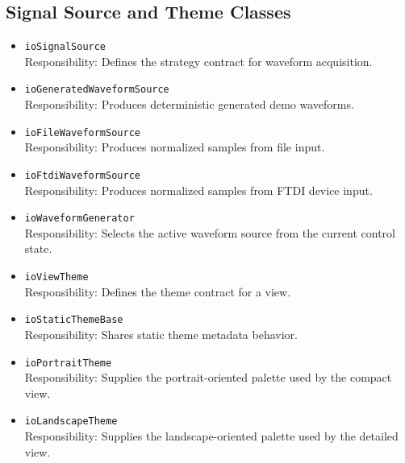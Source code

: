 \subsection{Signal Source and Theme Classes}
\begin{itemize}
    \item \texttt{ioSignalSource} \\
    Responsibility: Defines the strategy contract for waveform acquisition.

    \item \texttt{ioGeneratedWaveformSource} \\
    Responsibility: Produces deterministic generated demo waveforms.

    \item \texttt{ioFileWaveformSource} \\
    Responsibility: Produces normalized samples from file input.

    \item \texttt{ioFtdiWaveformSource} \\
    Responsibility: Produces normalized samples from FTDI device input.

    \item \texttt{ioWaveformGenerator} \\
    Responsibility: Selects the active waveform source from the current control state.

    \item \texttt{ioViewTheme} \\
    Responsibility: Defines the theme contract for a view.

    \item \texttt{ioStaticThemeBase} \\
    Responsibility: Shares static theme metadata behavior.

    \item \texttt{ioPortraitTheme} \\
    Responsibility: Supplies the portrait-oriented palette used by the compact view.

    \item \texttt{ioLandscapeTheme} \\
    Responsibility: Supplies the landscape-oriented palette used by the detailed view.
\end{itemize}

